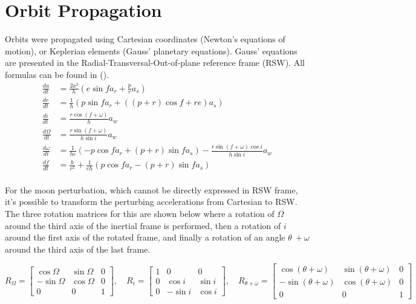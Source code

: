 \documentclass{article}
\begin{document}
\section{Orbit Propagation}

Orbits were propagated using Cartesian coordinates (Newton’s equations of motion), or Keplerian elements (Gauss’ planetary equations). Gauss' equations are presented in the Radial-Transversal-Out-of-plane reference frame (RSW). All formulas can be found in ().\\ %

\begin{align*}
	\frac{da}{dt} &= \frac{2a^2}{h} \left( e\sin f a_r + \frac{p}{r} a_s \right) \\[10pt]
	\frac{de}{dt} &= \frac{1}{h} \left( p\sin f a_r + \left( (p + r) \cos f + re \right) a_s \right) \\[10pt]
	\frac{di}{dt} &= \frac{r\cos (f + \omega)}{h} a_w \\[10pt]
	\frac{d\Omega}{dt} &= \frac{r\sin (f + \omega)}{h\sin i} a_w \\[10pt]
	\frac{d\omega}{dt} &= \frac{1}{he} \left( -p\cos f a_r + (p + r)\sin f a_s \right) - \frac{r\sin(f + \omega) \cos i}{h\sin i} a_w \\[10pt]
	\frac{df}{dt} &= \frac{h}{r^2} + \frac{1}{eh} \left( p\cos f a_r - (p + r)\sin f a_s \right)
\end{align*}
\\

For the moon perturbation, which cannot be directly expressed in RSW frame, it's possible to transform the perturbing accelerations from Cartesian to RSW. The three rotation matrices for this are shown below where a rotation of \(\Omega\) around the third axis of the inertial frame is performed, then a rotation of \(i\) around the first axis of the rotated frame, and finally a rotation of an angle \(\theta\ + \omega\) around the third axis of the last frame. 

\[
R_{\Omega} = \begin{bmatrix}
	\cos \Omega & \sin \Omega & 0 \\
	-\sin \Omega & \cos \Omega & 0 \\
	0 & 0 & 1
\end{bmatrix}, \quad
R_{i} = \begin{bmatrix}
	1 & 0 & 0 \\
	0 & \cos i & \sin i \\
	0 & -\sin i & \cos i
\end{bmatrix}, \quad
R_{\theta + \omega} = \begin{bmatrix}
	\cos (\theta + \omega) & \sin (\theta + \omega) & 0 \\
	-\sin (\theta + \omega) & \cos (\theta + \omega) & 0 \\
	0 & 0 & 1
\end{bmatrix}
\]
\end{document}
